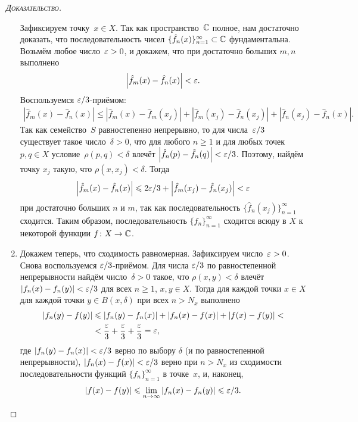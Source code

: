 \documentclass[../complex-analysis.tex]{subfiles}
\begin{document}
\begin{proof}[\normalfont\textsc{Доказательство}]
\begin{enumerate}
   Зафиксируем точку~$ x \in X $. Так как пространство~$ \mathbb{C} $  полное, нам достаточно доказать, что последовательность чисел $\{\hat f_{n}(x)\}_{n=1}^{\infty} \subset \mathbb{C}$  фундаментальна. Возьмём любое число~$ \varepsilon > 0 $, и докажем, что при достаточно больших $ m,n $ выполнено
   \begin{align*}
    \left| \hat f_m(x) - \hat f_n(x) \right| < \varepsilon.
   \end{align*} Воспользуемся $ \varepsilon / 3 $-приёмом:
   \begin{align*}
    \left| \hat f_m(x) - \hat f_n(x) \right| \leqslant \left| \hat f_m(x) - \hat f_m(x_j) \right| + \left| \hat f_m(x_j) - \hat f_n(x_j) \right| + \left| \hat f_n(x_j) - \hat f_n(x) \right|.
   \end{align*} Так как семейство~$ S $ равностепенно непрерывно, то для числа~$ \varepsilon / 3 $ существует такое число~$ \delta>0 $, что для любого $ n \geqslant 1 $ и для любых точек~$ p,q \in X $ условие~$ \rho(p,q) < \delta $ влечёт $ \left| \hat f_n(p) - \hat f_n(q) \right| < \varepsilon / 3$. Поэтому, найдём точку $ x_j $ такую, что $ \rho(x,x_j) < \delta $. Тогда
   \begin{align*}
    \left| \hat f_m(x) - \hat f_n(x) \right| \leqslant 2\varepsilon / 3 + \left| \hat f_m(x_j) - \hat f_n(x_j) \right| < \varepsilon
   \end{align*} при достаточно больших $ n $ и $ m $, так как последовательность $\{\hat f_{n}(x_j)\}_{n=1}^{\infty} $  сходится. Таким образом, последовательность $ \{\hat f_{n}\}_{n=1}^{\infty}  $ сходится всюду в $ X $ к некоторой функции $ f \colon X \to \mathbb{C} $.

  \item Докажем теперь, что сходимость равномерная. Зафиксируем число~$ \varepsilon>0 $. Снова воспользуемся $ \varepsilon / 3 $-приёмом. Для числа $ \varepsilon / 3 $ по равностепенной непрерывности найдём число~$ \delta > 0 $ такое, что $ \rho(x,y) < \delta $ влечёт $ \left| f_n(x)-f_n(y) \right| < \varepsilon / 3$ для всех $ n \geqslant 1 $, $ x,y\in X $. Тогда для каждой точки $ x \in X $ для каждой точки $ y \in B(x,\delta) $ при всех $ n > N_x $ выполнено
   \begin{align*}
    \left| f_n(y) - f(y) \right| &\leqslant \left| f_n(y) - f_n(x) \right| + \left| f_n(x) - f(x) \right| + \left| f(x) - f(y) \right| < \\
    &< \frac{\varepsilon}{3} + \frac{\varepsilon}{3} + \frac{\varepsilon}{3} = \varepsilon,
   \end{align*} где $ \left| f_n(y) - f_n(x) \right| < \varepsilon / 3$ верно по выбору $ \delta $ (и по равностепенной непрерывности), $ \left| f_n(x) - f(x) \right| < \varepsilon / 3 $ верно при $ n > N_x $ из сходимости последовательности функций  $ \{f_{n}\}_{n=1}^{\infty}  $ в точке~$ x $, и, наконец,
   \begin{align*}
    \left| f(x) - f(y) \right| \leqslant \lim_{n \to \infty} \left| f_n(x) - f_n(y) \right| \leqslant \varepsilon / 3.
   \end{align*}


\end{enumerate}
\end{proof}
\end{document}
